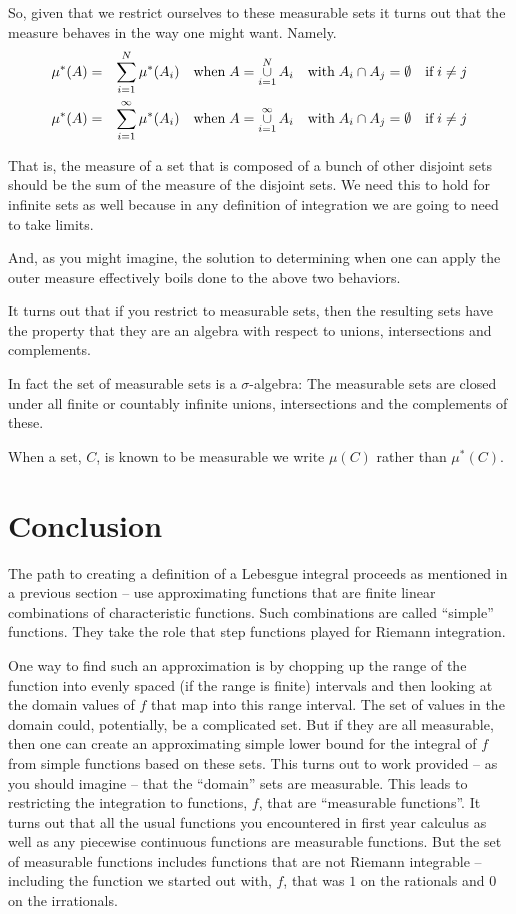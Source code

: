 \documentclass{article}
\begin{document}
So, given that we restrict ourselves to these measurable sets it turns out that
the measure behaves in the way one might want. Namely.
\begin{eqnarray*}
	\mu^*(A) & = & \sum_{i=1}^N\limits \mu^*(A_i) \quad \text{when} \; A = \mathop{\cup}_{i=1}^N\limits A_i \quad \text{with} \;  A_i \cap A_j = \emptyset \quad \text{if} \; i \neq j \\
	\mu^*(A) & = & \sum_{i=1}^\infty\limits \mu^*(A_i) \quad \text{when} \; A = \mathop{\cup}_{i=1}^\infty\limits A_i \quad \text{with} \; A_i \cap A_j = \emptyset \quad \text{if} \; i \neq j
\end{eqnarray*}

That is, the measure of a set that is composed of a bunch of other disjoint 
sets should be the sum of the measure of the disjoint sets. We need this to hold
for infinite sets as well because in any definition of integration we are going 
to need to take limits.

And, as you might imagine, the solution to determining when one can apply the 
outer measure effectively boils done to the above two behaviors.

It turns out that if you restrict to measurable sets, 
then the resulting sets have the property that they are an 
algebra with respect to unions, intersections and complements. 

In fact the set of measurable sets is a $\sigma$-algebra:
The measurable sets are closed under all finite or countably infinite unions, intersections and the complements of these.

When a set, $C$, is known to be measurable we write $\mu(C)$ rather than $\mu^*(C)$.

\section{Conclusion}

The path to creating a definition of a Lebesgue integral proceeds as mentioned 
in a previous section -- use approximating functions that are finite linear
combinations of characteristic functions. Such combinations are called ``simple''
functions. They take the role that step functions played for Riemann integration. 

One way to find such an approximation is by chopping up the range of the function 
into evenly spaced (if the range is finite) intervals and then looking at the 
domain values of $f$ that map into this range interval. The set of values in 
the domain could, potentially, be a complicated set. But if they are all measurable, then 
one can create an approximating simple lower bound for the integral of $f$ 
from simple functions based on these sets. This turns out to work provided -- 
as you should imagine -- that the ``domain'' sets are measurable. This leads to 
restricting the integration to functions, $f$, that are ``measurable functions''. 
It turns out that all the usual functions you encountered in first year 
calculus as well as any piecewise continuous functions are measurable functions. 
But the set of measurable functions includes functions that are
not Riemann integrable -- including the function we started out with, $f$, that
was $1$ on the rationals and $0$ on the irrationals.
\end{document}
